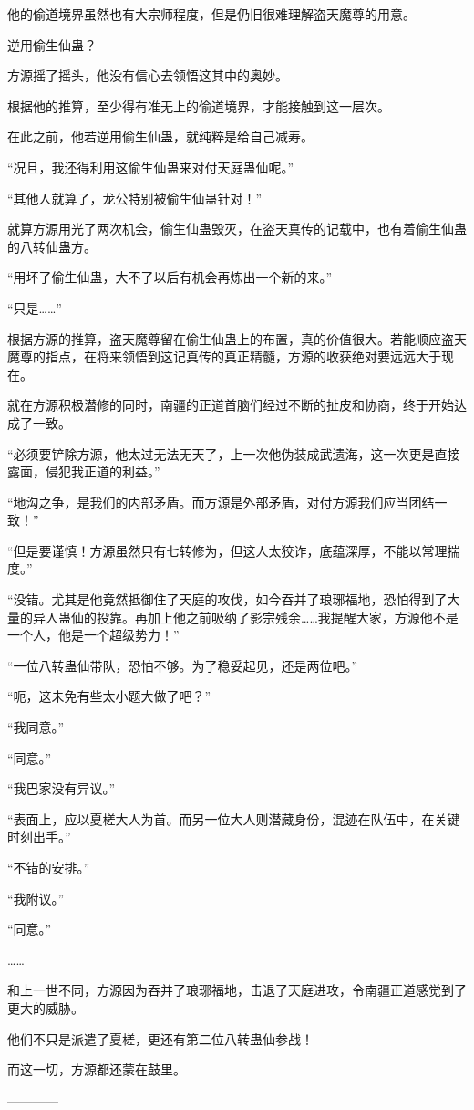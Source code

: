 \begin{this_body}
他的偷道境界虽然也有大宗师程度，但是仍旧很难理解盗天魔尊的用意。

逆用偷生仙蛊？

方源摇了摇头，他没有信心去领悟这其中的奥妙。

根据他的推算，至少得有准无上的偷道境界，才能接触到这一层次。

在此之前，他若逆用偷生仙蛊，就纯粹是给自己减寿。

“况且，我还得利用这偷生仙蛊来对付天庭蛊仙呢。”

“其他人就算了，龙公特别被偷生仙蛊针对！”

就算方源用光了两次机会，偷生仙蛊毁灭，在盗天真传的记载中，也有着偷生仙蛊的八转仙蛊方。

“用坏了偷生仙蛊，大不了以后有机会再炼出一个新的来。”

“只是……”

根据方源的推算，盗天魔尊留在偷生仙蛊上的布置，真的价值很大。若能顺应盗天魔尊的指点，在将来领悟到这记真传的真正精髓，方源的收获绝对要远远大于现在。

就在方源积极潜修的同时，南疆的正道首脑们经过不断的扯皮和协商，终于开始达成了一致。

“必须要铲除方源，他太过无法无天了，上一次他伪装成武遗海，这一次更是直接露面，侵犯我正道的利益。”

“地沟之争，是我们的内部矛盾。而方源是外部矛盾，对付方源我们应当团结一致！”

“但是要谨慎！方源虽然只有七转修为，但这人太狡诈，底蕴深厚，不能以常理揣度。”

“没错。尤其是他竟然抵御住了天庭的攻伐，如今吞并了琅琊福地，恐怕得到了大量的异人蛊仙的投靠。再加上他之前吸纳了影宗残余……我提醒大家，方源他不是一个人，他是一个超级势力！”

“一位八转蛊仙带队，恐怕不够。为了稳妥起见，还是两位吧。”

“呃，这未免有些太小题大做了吧？”

“我同意。”

“同意。”

“我巴家没有异议。”

“表面上，应以夏槎大人为首。而另一位大人则潜藏身份，混迹在队伍中，在关键时刻出手。”

“不错的安排。”

“我附议。”

“同意。”

……

和上一世不同，方源因为吞并了琅琊福地，击退了天庭进攻，令南疆正道感觉到了更大的威胁。

他们不只是派遣了夏槎，更还有第二位八转蛊仙参战！

而这一切，方源都还蒙在鼓里。

------------

\end{this_body}

